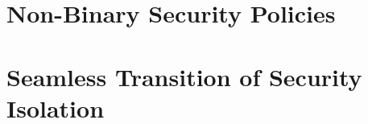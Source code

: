 %



\section{Non-Binary Security Policies}


\section{Seamless Transition of Security Isolation}




